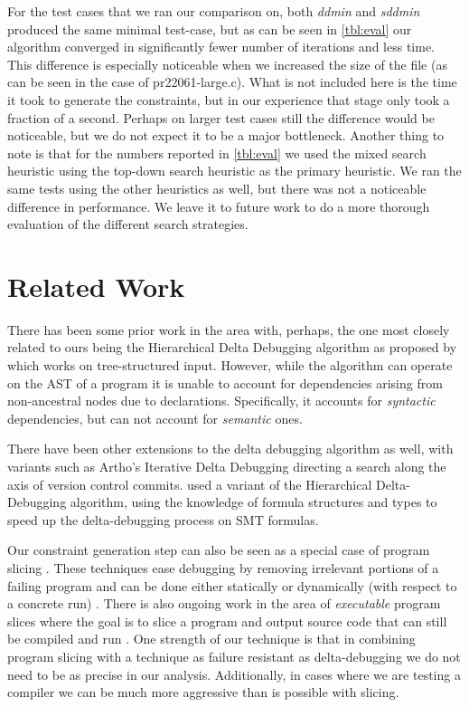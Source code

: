 \documentclass[preprint]{acm_proc_article-sp}
\begin{document}
For the test cases that we ran our comparison on, both \emph{ddmin} and
\emph{sddmin} produced the same minimal test-case, but as can be seen in
\autoref{tbl:eval} our algorithm converged in significantly fewer number of
iterations and less time. This difference is especially noticeable when we
increased the size of the file (as can be seen in the case of
pr22061-large.c). What is not included here is the time it took to generate the
constraints, but in our experience that stage only took a fraction of a
second. Perhaps on larger test cases still the difference would be noticeable,
but we do not expect it to be a major bottleneck. Another thing to note is that
for the numbers reported in \autoref{tbl:eval} we used the mixed search
heuristic using the top-down search heuristic as the primary heuristic. We ran
the same tests using the other heuristics as well, but there was not a
noticeable difference in performance. We leave it to future work to do a more
thorough evaluation of the different search strategies.

\section{Related Work}



There has been some prior work in the area with, perhaps, the one most closely
related to ours being the Hierarchical Delta Debugging algorithm as proposed by
\citet{hdd} which works on tree-structured input. However, while the algorithm
can operate on the AST of a program it is unable to account for dependencies
arising from non-ancestral nodes due to declarations. Specifically, it accounts
for \emph{syntactic} dependencies, but can not account for \emph{semantic} ones.

There have been other extensions to the delta debugging algorithm as well, with
variants such as Artho's Iterative Delta Debugging \citep{idd} directing a search
along the axis of version control commits. \citet{smt} used a
variant of the Hierarchical Delta-Debugging algorithm, using the knowledge of
formula structures and types to speed up the delta-debugging process on SMT
formulas.

Our constraint generation step can also be seen as a special case of program
slicing \citep{weiser81} \citep{tip94}. These techniques ease debugging by
removing irrelevant portions of a failing program and can be done either
statically or dynamically (with respect to a concrete run)
\citep{agrawal90}. There is also ongoing work in the area of \emph{executable}
program slices where the goal is to slice a program and output source code
that can still be compiled and run \citep{horwitz10}. One strength of our
technique is that in combining program slicing with a technique as failure
resistant as delta-debugging we do not need to be as precise in our
analysis. Additionally, in cases where we are testing a compiler we can be much
more aggressive than is possible with slicing.
\end{document}
